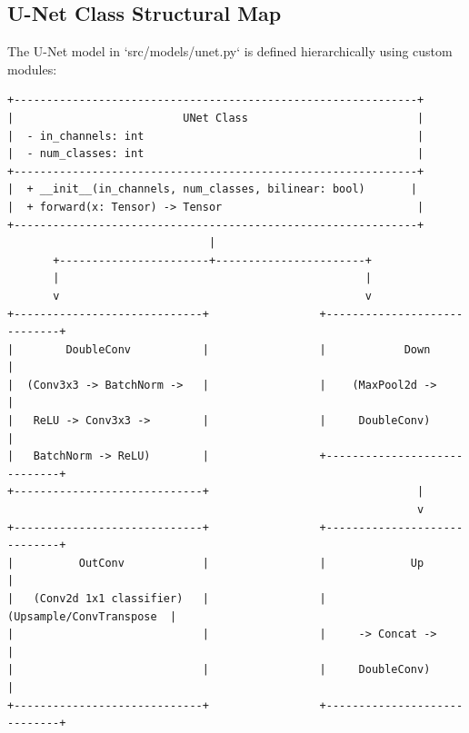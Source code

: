 \documentclass[11pt,journal,onecolumn]{IEEEtran}
\begin{document}
\subsection{U-Net Class Structural Map}
The U-Net model in `src/models/unet.py` is defined hierarchically using custom modules:
\begin{verbatim}
+--------------------------------------------------------------+
|                          UNet Class                          |
|  - in_channels: int                                          |
|  - num_classes: int                                          |
+--------------------------------------------------------------+
|  + __init__(in_channels, num_classes, bilinear: bool)       |
|  + forward(x: Tensor) -> Tensor                              |
+--------------------------------------------------------------+
                               |
       +-----------------------+-----------------------+
       |                                               |
       v                                               v
+-----------------------------+                 +-----------------------------+
|        DoubleConv           |                 |            Down             |
|  (Conv3x3 -> BatchNorm ->   |                 |    (MaxPool2d ->            |
|   ReLU -> Conv3x3 ->        |                 |     DoubleConv)             |
|   BatchNorm -> ReLU)        |                 +-----------------------------+
+-----------------------------+                                |
                                                               v
+-----------------------------+                 +-----------------------------+
|          OutConv            |                 |             Up              |
|   (Conv2d 1x1 classifier)   |                 |    (Upsample/ConvTranspose  |
|                             |                 |     -> Concat ->            |
|                             |                 |     DoubleConv)             |
+-----------------------------+                 +-----------------------------+
\end{verbatim}
\end{document}
